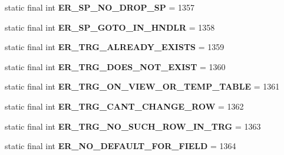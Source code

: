 \begin{DoxyCompactItemize}
static final int {\bfseries E\+R\+\_\+\+S\+P\+\_\+\+N\+O\+\_\+\+D\+R\+O\+P\+\_\+\+SP} = 1357
\item 
\mbox{\label{classcom_1_1mysql_1_1jdbc_1_1_mysql_error_numbers_aa18a706bad7e93463f5fd63673d9e522}} 
static final int {\bfseries E\+R\+\_\+\+S\+P\+\_\+\+G\+O\+T\+O\+\_\+\+I\+N\+\_\+\+H\+N\+D\+LR} = 1358
\item 
\mbox{\label{classcom_1_1mysql_1_1jdbc_1_1_mysql_error_numbers_ac283ca51fa1fa6fa093398390f6041f7}} 
static final int {\bfseries E\+R\+\_\+\+T\+R\+G\+\_\+\+A\+L\+R\+E\+A\+D\+Y\+\_\+\+E\+X\+I\+S\+TS} = 1359
\item 
\mbox{\label{classcom_1_1mysql_1_1jdbc_1_1_mysql_error_numbers_a7874297c79504510a67178e100d0fbf2}} 
static final int {\bfseries E\+R\+\_\+\+T\+R\+G\+\_\+\+D\+O\+E\+S\+\_\+\+N\+O\+T\+\_\+\+E\+X\+I\+ST} = 1360
\item 
\mbox{\label{classcom_1_1mysql_1_1jdbc_1_1_mysql_error_numbers_a9a4c2f927c51af9436be4d9aeeaf50c9}} 
static final int {\bfseries E\+R\+\_\+\+T\+R\+G\+\_\+\+O\+N\+\_\+\+V\+I\+E\+W\+\_\+\+O\+R\+\_\+\+T\+E\+M\+P\+\_\+\+T\+A\+B\+LE} = 1361
\item 
\mbox{\label{classcom_1_1mysql_1_1jdbc_1_1_mysql_error_numbers_a60a57770866098ba1396c4fb70eb3655}} 
static final int {\bfseries E\+R\+\_\+\+T\+R\+G\+\_\+\+C\+A\+N\+T\+\_\+\+C\+H\+A\+N\+G\+E\+\_\+\+R\+OW} = 1362
\item 
\mbox{\label{classcom_1_1mysql_1_1jdbc_1_1_mysql_error_numbers_a8804c83ee8d014f2ea2d76bc539bda46}} 
static final int {\bfseries E\+R\+\_\+\+T\+R\+G\+\_\+\+N\+O\+\_\+\+S\+U\+C\+H\+\_\+\+R\+O\+W\+\_\+\+I\+N\+\_\+\+T\+RG} = 1363
\item 
\mbox{\label{classcom_1_1mysql_1_1jdbc_1_1_mysql_error_numbers_af84ed8f4548125569df3d3feed1ee133}} 
static final int {\bfseries E\+R\+\_\+\+N\+O\+\_\+\+D\+E\+F\+A\+U\+L\+T\+\_\+\+F\+O\+R\+\_\+\+F\+I\+E\+LD} = 1364

\end{DoxyCompactItemize}
